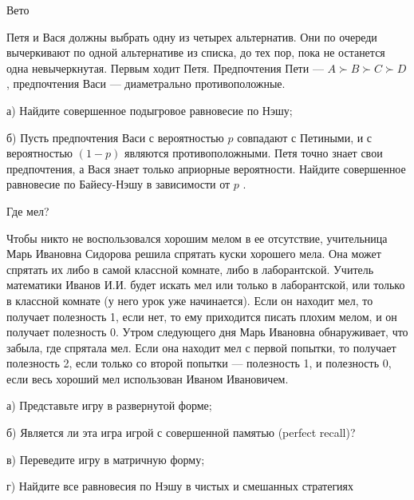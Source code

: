 \begin{problem}
 Вето\par
Петя и Вася должны выбрать одну из четырех альтернатив. Они по очереди вычеркивают по одной альтернативе из списка, до тех пор, пока не останется одна невычеркнутая. Первым ходит Петя. Предпочтения Пети —  $A\succ B\succ C\succ D$ , предпочтения Васи — диаметрально противоположные.\par
а) Найдите совершенное подыгровое равновесие по Нэшу;\par
б) Пусть предпочтения Васи с вероятностью  $p$  совпадают с Петиными, и с вероятностью  $\left(1-p\right)$  являются противоположными. Петя точно знает свои предпочтения, а Вася знает только априорные вероятности. Найдите совершенное равновесие по Байесу-Нэшу в зависимости от  $p$ .\par



\begin{sol}

\end{sol}
\end{problem}



\begin{problem}
 Где мел?\par
Чтобы никто не воспользовался хорошим мелом в ее отсутствие, учительница Марь Ивановна Сидорова решила спрятать куски хорошего мела. Она может спрятать их либо в самой классной комнате, либо в лаборантской. Учитель математики Иванов И.И. будет искать мел или только в лаборантской, или только в классной комнате (у него урок уже начинается). Если он находит мел, то получает полезность 1, если нет, то ему приходится писать плохим мелом, и он получает полезность 0. Утром следующего дня Марь Ивановна обнаруживает, что забыла, где спрятала мел. Если она находит мел с первой попытки, то получает полезность 2, если только со второй попытки — полезность 1, и полезность 0, если весь хороший мел использован Иваном Ивановичем.\par
а) Представьте игру в развернутой форме;\par
б) Является ли эта игра игрой с совершенной памятью (perfect recall)?\par
в) Переведите игру в матричную форму;\par
г) Найдите все равновесия по Нэшу в чистых и смешанных стратегиях\par



\begin{sol}

\end{sol}
\end{problem}



